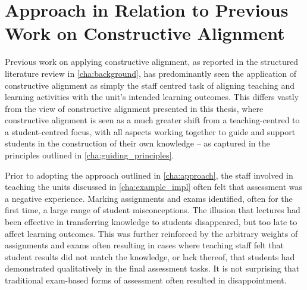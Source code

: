 

\section{Approach in Relation to Previous Work on Constructive Alignment} %
\label{sec:approach_in_relation_to_previous_work}

Previous work on applying constructive alignment, as reported in the structured literature review in \cref{cha:background}, has predominantly seen the application of constructive alignment as simply the staff centred task of aligning teaching and learning activities with the unit's intended learning outcomes. This differs vastly from the view of constructive alignment presented in this thesis, where constructive alignment is seen as a much greater shift from a teaching-centred to a student-centred focus, with all aspects working together to guide and support students in the construction of their own knowledge -- as captured in the principles outlined in \cref{cha:guiding_principles}.


Prior to adopting the approach outlined in \cref{cha:approach}, the staff involved in teaching the units discussed in \cref{cha:example_impl} often felt that assessment was a negative experience. Marking assignments and exams identified, often for the first time, a large range of student misconceptions. The illusion that lectures had been effective in transferring knowledge to students disappeared, but too late to affect learning outcomes. This was further reinforced by the arbitrary weights of assignments and exams often resulting in cases where teaching staff felt that student results did not match the knowledge, or lack thereof, that students had demonstrated qualitatively in the final assessment tasks. It is not surprising that traditional exam-based forms of assessment often resulted in disappointment.

